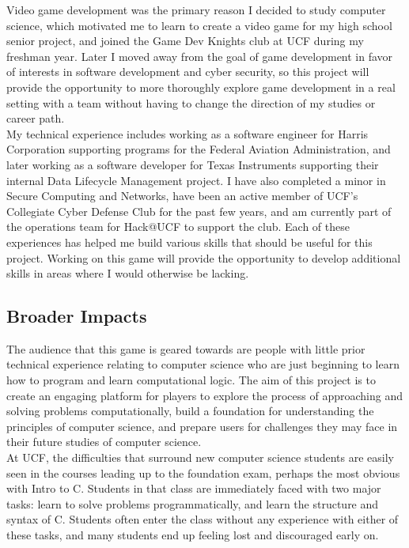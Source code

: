 Video game development was the primary reason I decided to study computer
science, which motivated me to learn to create a video game for my high school
senior project, and joined the Game Dev Knights club at UCF during my freshman
year. Later I moved away from the goal of game development in favor of interests
in software development and cyber security, so this project will provide the
opportunity to more thoroughly explore game development in a real setting with a
team without having to change the direction of my studies or career path.\\

My technical experience includes working as a software engineer for Harris
Corporation supporting programs for the Federal Aviation Administration, and
later working as a software developer for Texas Instruments supporting their
internal Data Lifecycle Management project. I have also completed a minor in
Secure Computing and Networks, have been an active member of UCF’s Collegiate
Cyber Defense Club for the past few years, and am currently part of the
operations team for Hack@UCF to support the club. Each of these experiences has
helped me build various skills that should be useful for this project. Working
on this game will provide the opportunity to develop additional skills in areas
where I would otherwise be lacking.

\subsection{Broader Impacts}

The audience that this game is geared towards are people with little prior
technical experience relating to computer science who are just beginning to
learn how to program and learn computational logic. The aim of this project is
to create an engaging platform for players to explore the process of approaching
and solving problems computationally, build a foundation for understanding the
principles of computer science, and prepare users for challenges they may face
in their future studies of computer science.\\

At UCF, the difficulties that surround new computer science students are easily
seen in the courses leading up to the foundation exam, perhaps the most obvious
with Intro to C. Students in that class are immediately faced with two major
tasks: learn to solve problems programmatically, and learn the structure and
syntax of C. Students often enter the class without any experience with either
of these tasks, and many students end up feeling lost and discouraged early
on.\\


